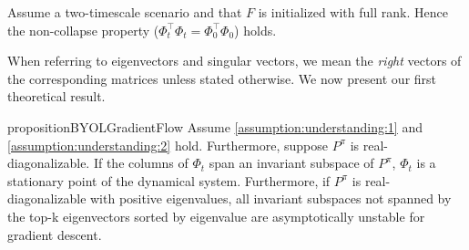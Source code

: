 \begin{assumption}
\label{assumption:understanding:3}
    Assume a two-timescale scenario and that $F$ is initialized with full rank. 
    Hence the non-collapse property ($\Phi_t^\top\Phi_t = \Phi_0^\top\Phi_0$) \parencite{tang2022understanding} holds.
\end{assumption}
When referring to eigenvectors and singular vectors, we mean the \emph{right} vectors of the corresponding matrices unless stated otherwise.
We now present our first theoretical result.

\begin{restatable}{proposition}{BYOLGradientFlow}\label{prop:understanding:1}
Assume \autoref{assumption:understanding:1} and \autoref{assumption:understanding:2} hold.
Furthermore, suppose $P^\pi$ is real-diagonalizable. 
If the columns of $\Phi_t$ span an invariant subspace of $P^\pi$, $\Phi_t$ is a stationary point of the dynamical system.
Furthermore, if $P^\pi$ is real-diagonalizable with positive eigenvalues, all invariant subspaces not spanned by the top-k eigenvectors sorted by eigenvalue are asymptotically unstable for gradient descent.
\end{restatable}

